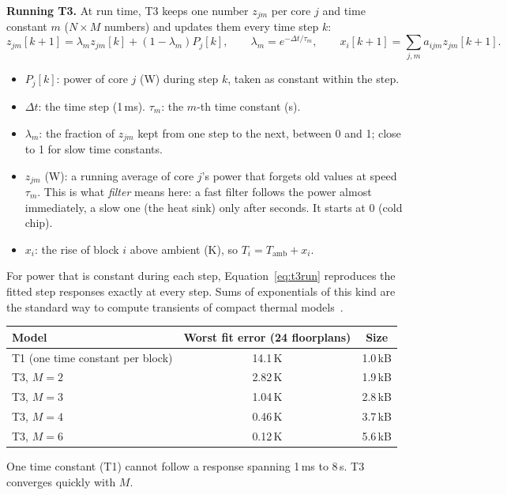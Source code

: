 \documentclass[11pt,a4paper]{article}
\begin{document}
\textbf{Running T3.} At run time, T3 keeps one number $z_{jm}$ per core $j$ and time constant $m$
($N \times M$ numbers) and updates them every time step $k$:
\begin{equation}
  z_{jm}[k+1] = \lambda_m z_{jm}[k] + (1-\lambda_m) P_j[k],\qquad \lambda_m = e^{-\Delta t/\tau_m},
  \qquad x_i[k+1] = \sum_{j,m} a_{ijm} z_{jm}[k+1].
  \label{eq:t3run}
\end{equation}
\begin{itemize}
  \item $P_j[k]$: power of core $j$ (W) during step $k$, taken as constant within the step.
  \item $\Delta t$: the time step (1\,ms). $\tau_m$: the $m$-th time constant (s).
  \item $\lambda_m$: the fraction of $z_{jm}$ kept from one step to the next, between 0 and 1;
        close to 1 for slow time constants.
  \item $z_{jm}$ (W): a running average of core $j$'s power that forgets old values at speed
        $\tau_m$. This is what \emph{filter} means here: a fast filter follows the power almost
        immediately, a slow one (the heat sink) only after seconds. It starts at 0 (cold chip).
  \item $x_i$: the rise of block $i$ above ambient (K), so $T_i = T_\text{amb} + x_i$.
\end{itemize}
For power that is constant during each step, Equation~\eqref{eq:t3run} reproduces the fitted step
responses exactly at every step. Sums of exponentials of this kind are the standard way to compute
transients of compact thermal models~\cite{pagani15}.

\begin{center}
\small
\begin{tabular}{@{}l c c@{}}
\toprule
Model & Worst fit error (24 floorplans) & Size \\
\midrule
T1 (one time constant per block) & 14.1\,K & 1.0\,kB \\
T3, $M=2$ & 2.82\,K & 1.9\,kB \\
T3, $M=3$ & 1.04\,K & 2.8\,kB \\
T3, $M=4$ & 0.46\,K & 3.7\,kB \\
T3, $M=6$ & 0.12\,K & 5.6\,kB \\
\bottomrule
\end{tabular}
\end{center}
One time constant (T1) cannot follow a response spanning 1\,ms to 8\,s. T3 converges quickly with
$M$.
\end{document}
